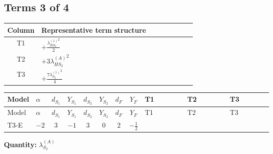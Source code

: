 \documentclass[8pt]{article}
\begin{document}
\begin{landscape}
\subsection*{Terms 3 of 4}
\begin{center}
\begin{tabular}{@{}c >{\raggedright\arraybackslash}p{0.82\linewidth}@{}}
\toprule
Column & Representative term structure \\
\midrule
T1 & \(\displaystyle +\frac{{\lambda_{HS_2}^{(1)}}^2}{2}\) \\
\midrule
T2 & \(\displaystyle +3 {\lambda_{HS_2}^{(A)}}^2\) \\
\midrule
T3 & \(\displaystyle +\frac{7 {\lambda_{S_2}^{(1)}}^2}{4}\) \\
\midrule
\bottomrule
\end{tabular}
\end{center}
\smallskip
\tiny
\begin{longtable}{@{}llcccccc >{\raggedright\arraybackslash}p{0.21\linewidth} >{\raggedright\arraybackslash}p{0.21\linewidth} >{\raggedright\arraybackslash}p{0.21\linewidth}@{}}
\toprule
Model & $\alpha$ & $d_{S_1}$ & $Y_{S_1}$ & $d_{S_2}$ & $Y_{S_2}$ & $d_F$ & $Y_F$ & T1 & T2 & T3 \\
\midrule
\endfirsthead
\toprule
Model & $\alpha$ & $d_{S_1}$ & $Y_{S_1}$ & $d_{S_2}$ & $Y_{S_2}$ & $d_F$ & $Y_F$ & T1 & T2 & T3 \\
\midrule
\endhead
T3-E & $-2$ & $3$ & $-1$ & $3$ & $0$ & $2$ & $-\frac{1}{2}$ & \scriptsize\adjustbox{max width=\linewidth}{$\begin{gathered} +\frac{{\lambda_{HS_2}^{(1)}}^2}{2}\end{gathered}$} & \scriptsize\adjustbox{max width=\linewidth}{$\begin{gathered} +3 {\lambda_{HS_2}^{(A)}}^2\end{gathered}$} & \scriptsize\adjustbox{max width=\linewidth}{$\begin{gathered} +\frac{7 {\lambda_{S_2}^{(1)}}^2}{4}\end{gathered}$} \\
\midrule
\bottomrule
\end{longtable}
\clearpage
\noindent\textbf{Quantity: }$\lambda_{S_2}^{(A)}$\par\smallskip

\end{landscape}
\end{document}
